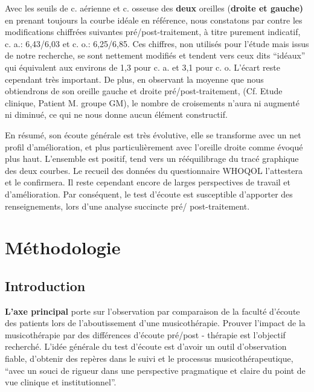 Avec les
seuils
de c. aérienne et c. osseuse des\textbf{ deux} oreilles (\textbf{droite et gauche)} en prenant toujours 
 la courbe idéale en référence, nous
constatons par contre les modifications chiffrées suivantes pré/post-traitement, à titre purement indicatif,
c. a.: 6,43/6,03 et c. o.: 6,25/6,85.
Ces chiffres, non utilisés pour l'étude mais issus de notre recherche, se sont nettement
modifiés et tendent vers
ceux dits ``idéaux''  qui équivalent aux environs de 1,3 pour
c. a. et 3,1 pour 
c. o. L'écart reste cependant très important. %
De plus, en observant la moyenne que nous obtiendrons de son oreille gauche et droite 
pré/post-traitement, (Cf. Etude 
clinique, Patient M. groupe GM), le
nombre de croisements n'aura ni augmenté ni diminué, ce qui ne nous donne 
aucun élément constructif.
 
En résumé, son écoute générale est très évolutive, elle se transforme avec un net profil d'amélioration, et 
plus particulièrement avec l'oreille
droite comme évoqué plus haut. L'ensemble est positif, tend vers un
rééquilibrage du tracé graphique des deux courbes. Le recueil des données du
questionnaire WHOQOL l'attestera et le confirmera.
Il reste cependant encore de larges perspectives de travail et d'amélioration.
Par conséquent, le test d'écoute est susceptible d'apporter des renseignements, lors
d'une analyse succincte pré/ post-traitement.


\chapter{Méthodologie} 

\section{Introduction}
 
\textbf{L'axe principal} porte sur l'observation par comparaison de la faculté d'écoute des 
patients lors de l'aboutissement d'une musicothérapie.
Prouver l'impact de la musicothérapie par des différences d'écoute pré/post - 
thérapie est l'objectif  recherché.
L'idée générale du test d'écoute est d'avoir un outil d'observation fiable, d'obtenir des repères 
dans le suivi et le processus musicothérapeutique, \enquote {avec un souci de rigueur dans une 
	perspective pragmatique et claire du point de vue clinique et institutionnel}\autocite[p. 
36]{vrait_musicotherapie_2018}. 

